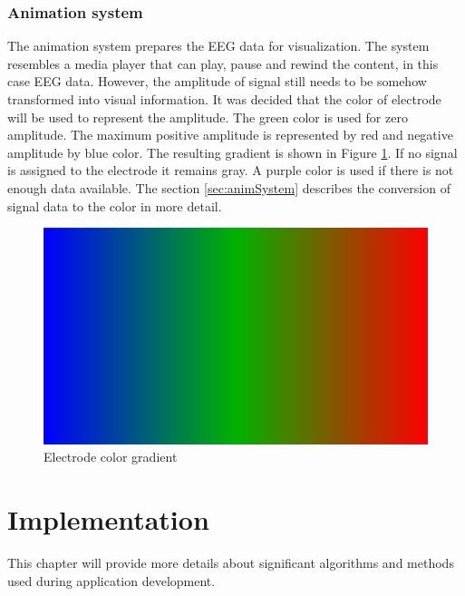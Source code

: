 \subsection{Animation system}
\label{ssec:concAnimSystem}
The animation system prepares the EEG data for visualization. The system resembles a media player that can play, pause and rewind the content, in this case EEG data. However, the amplitude of signal still needs to be somehow transformed into visual information. It was decided that the color of electrode will be used to represent the amplitude. The green color is used for zero amplitude. The maximum positive amplitude is represented by red and negative amplitude by blue color. The resulting gradient is shown in Figure \ref{fig:ElColorGradient}. If no signal is assigned to the electrode it remains gray. A purple color is used if there is not enough data available. The section \ref{sec:animSystem} describes the conversion of signal data to the color in more detail.

\begin{figure}[ht]
	\centering
	\includegraphics[width=0.8\linewidth, height=0.05\textheight]{fig/gradient.pdf}
	\caption{Electrode color gradient}
	\label{fig:ElColorGradient}
\end{figure}

\chapter{Implementation}
\label{implementation}
This chapter will provide more details about significant algorithms and methods used during application development.

